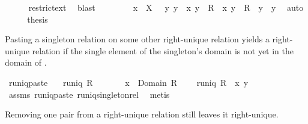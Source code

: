 \begin{isabellebody}
\ \ \ \ \isamarkupfalse%
\ restrict{\isacharunderscore}ext{\isacharprime}\ \isamarkupfalse%
\ blast\isanewline
\ \ \isamarkupfalse%
\ \isamarkupfalse%
\ {\isachardoublequoteopen}{\isasymdots}\ {\isasymlongleftrightarrow}\ {\isacharparenleft}{\isasymforall}\ x\ {\isasymin}\ X\ {\isachardot}\ {\isasymforall}\ y\ y{\isacharprime}\ {\isachardot}\ {\isacharparenleft}x{\isacharcomma}\ y{\isacharparenright}\ {\isasymin}\ R\ {\isasymand}\ {\isacharparenleft}x{\isacharcomma}\ y{\isacharprime}{\isacharparenright}\ {\isasymin}\ R\ {\isasymlongrightarrow}\ y\ {\isacharequal}\ y{\isacharprime}{\isacharparenright}{\isachardoublequoteclose}\ \isamarkupfalse%
\ auto\isanewline
\ \ \isamarkupfalse%
\ \isamarkupfalse%
\ {\isacharquery}thesis\ \isacommand{{\isachardot}}\isamarkupfalse%
\isanewline
{}\isamarkupfalse%
%
\endisatagproof
{\isafoldproof}%
%
\isadelimproof
%
\endisadelimproof
%
\isamarkuptrue%
%
\begin{isamarkuptext}%
Pasting a singleton relation on some other right-unique relation  yields a
  right-unique relation if the single element of the singleton's domain is not yet in the 
  domain of .%
\end{isamarkuptext}%
\isamarkuptrue%
\isamarkupfalse%
\ runiq{\isacharunderscore}paste{}{\isacharcolon}\isanewline
\ \ \ {\isachardoublequoteopen}runiq\ R{\isachardoublequoteclose}\isanewline
\ \ \ \ \ \ \ {\isachardoublequoteopen}x\ {\isasymnotin}\ Domain\ R{\isachardoublequoteclose}\ \isanewline
\ \ \ {\isachardoublequoteopen}runiq\ {\isacharparenleft}R\ {\isacharplus}{\isacharasterisk}\ {\isacharbraceleft}{\isacharparenleft}x{\isacharcomma}\ y{\isacharparenright}{\isacharbraceright}{\isacharparenright}{\isachardoublequoteclose}\isanewline
%
\isadelimproof
%
\endisadelimproof
%
\isatagproof
{}\isamarkupfalse%
\ assms\ runiq{\isacharunderscore}paste{}\ runiq{\isacharunderscore}singleton{\isacharunderscore}rel\ \isamarkupfalse%
\ metis%
\endisatagproof
{\isafoldproof}%
%
\isadelimproof
%
\endisadelimproof
%
\isamarkuptrue%
%
\begin{isamarkuptext}%
Removing one pair from a right-unique relation still leaves it right-unique.%
\end{isamarkuptext}%
\isamarkuptrue%
\isamarkupfalse%

\end{isabellebody}
